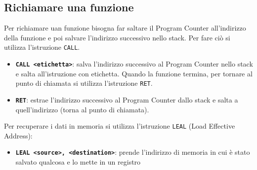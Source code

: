 \documentclass[a4paper]{article}
\theoremstyle{break}
\theoremstyle{break}
\theoremstyle{break}
\theoremstyle{break}
\begin{document}
\subsection{Richiamare una funzione}
Per richiamare uan funzione bisogna far saltare il Program Counter all'indirizzo della funzione
e poi salvare l'indirizzo successivo nello stack. Per fare ciò si utilizza l'istruzione \texttt{CALL}.
\begin{itemize}
	\item \textbf{\texttt{CALL <etichetta>}}: salva l'indirizzo successivo al Program Counter nello stack e salta all'istruzione con etichetta.
	      Quando la funzione termina, per tornare al punto di chiamata si utilizza l'istruzione \texttt{RET}.
	\item \textbf{\texttt{RET}}: estrae l'indirizzo successivo al Program Counter dallo stack e salta a quell'indirizzo (torna al punto di chiamata).
\end{itemize}

Per recuperare i dati in memoria si utilizza l'istruzione \texttt{LEAL} (Load Effective Address):
\begin{itemize}
	\item \textbf{\texttt{LEAL <source>, <destination>}}: prende l'indirizzo di memoria in cui è stato salvato qualcosa
	      e lo mette in un registro
\end{itemize}
\end{document}
